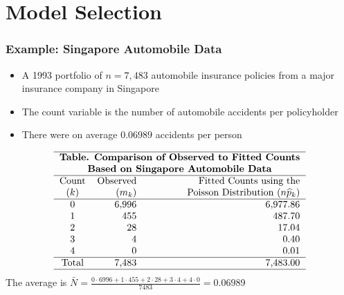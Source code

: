 \documentclass{beamer}
\begin{document}
\section{Model Selection}

\begin{frame}[shrink=3]
  \frametitle{Example: Singapore Automobile Data}
\begin{itemize}
\item A 1993 portfolio of $n=7,483$ automobile insurance policies from a major insurance company in
Singapore \vspace{2mm}
\item The count variable is the number of automobile accidents per
policyholder \vspace{2mm}
\item  There were on average $ 0.06989$ accidents per person \vspace{2mm}
\end{itemize}

\begin{equation*}
\begin{tabular}{crr}
\hline \multicolumn{3}{c}{\textbf{Table. Comparison of Observed to Fitted Counts }} \\
\multicolumn{3}{c}{\textbf{Based on Singapore Automobile Data}} \\
\hline
Count & Observed & Fitted Counts using the \\
$(k)$ & $(m_k)$ & Poisson Distribution $(n\widehat{p}_k)$ \\
\hline
0 & 6,996 & 6,977.86 \\
1 & 455 & 487.70 \\
2 & 28 & 17.04 \\
3 & 4 & 0.40 \\
4 & 0 & 0.01 \\ \hline Total & 7,483 & 7,483.00 \\ \hline
\end{tabular}
\end{equation*}
 \vspace{2mm}The average is $\bar{N} = \frac{0\cdot
6996 + 1 \cdot 455 + 2 \cdot 28 + 3 \cdot 4 + 4 \cdot 0}{7483} =
0.06989$

\end{frame}
\end{document}
